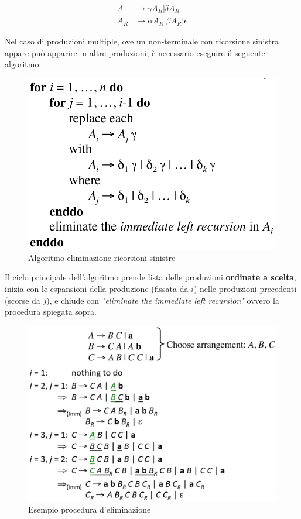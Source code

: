 \begin{align}
A   & \to \gamma A_R | \delta A_R \\
A_R & \to \alpha A_R | \beta A_R | \epsilon
\end{align}

Nel caso di produzioni multiple, ove un non-terminale con ricorsione sinistra
appare pu\`o apparire in altre produzioni, \`e necessario eseguire il seguente
algoritmo:

\begin{figure}[H]
\begin{center}
\includegraphics[scale=0.4]{res/image/elimination_Rleft}
\end{center}
\caption{Algoritmo eliminazione ricorsioni sinistre}
\label{img:eliminination_Rleft}
\end{figure}

Il ciclo principale dell'algoritmo prende lista delle produzioni
\textbf{ordinate a scelta}, inizia con le espansioni della produzione (fissata
da $i$) nelle produzioni precedenti (scorse da $j$), e chiude con
\textit{"eliminate the immediate left recursion"} ovvero la procedura spiegata
sopra.

\begin{figure}[H]
\begin{center}
\includegraphics[scale=0.3]{res/image/elimination_example}
\end{center}
\caption{Esempio procedura d'eliminazione}
\label{img:eliminination_example}
\end{figure}

